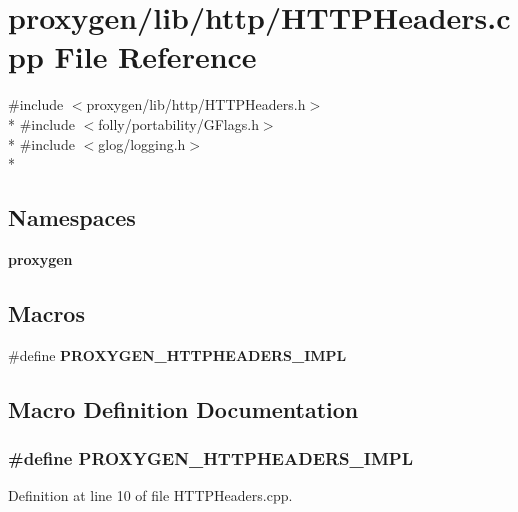\section{proxygen/lib/http/\+H\+T\+T\+P\+Headers.cpp File Reference}
\label{HTTPHeaders_8cpp}
{\ttfamily \#include $<$proxygen/lib/http/\+H\+T\+T\+P\+Headers.\+h$>$}\\*
{\ttfamily \#include $<$folly/portability/\+G\+Flags.\+h$>$}\\*
{\ttfamily \#include $<$glog/logging.\+h$>$}\\*
\subsection*{Namespaces}
\begin{DoxyCompactItemize}
\item 
 {\bf proxygen}
\end{DoxyCompactItemize}
\subsection*{Macros}
\begin{DoxyCompactItemize}
\item 
\#define {\bf P\+R\+O\+X\+Y\+G\+E\+N\+\_\+\+H\+T\+T\+P\+H\+E\+A\+D\+E\+R\+S\+\_\+\+I\+M\+PL}
\end{DoxyCompactItemize}


\subsection{Macro Definition Documentation}
\subsubsection[{P\+R\+O\+X\+Y\+G\+E\+N\+\_\+\+H\+T\+T\+P\+H\+E\+A\+D\+E\+R\+S\+\_\+\+I\+M\+PL}]{\setlength{\rightskip}{0pt plus 5cm}\#define P\+R\+O\+X\+Y\+G\+E\+N\+\_\+\+H\+T\+T\+P\+H\+E\+A\+D\+E\+R\+S\+\_\+\+I\+M\+PL}\label{HTTPHeaders_8cpp_afbb28de1846510380e9e1032ed8dd9f4}


Definition at line 10 of file H\+T\+T\+P\+Headers.\+cpp.

